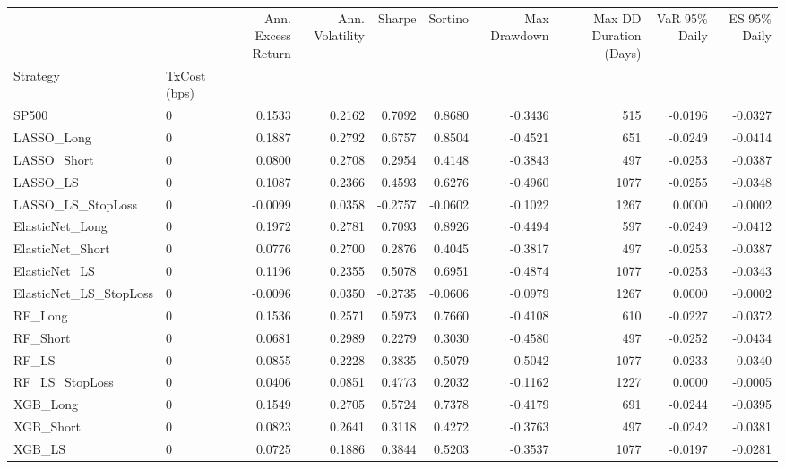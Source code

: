 \begin{tabular}{llrrrrrrrr}
\toprule
 &  & Ann. Excess Return & Ann. Volatility & Sharpe & Sortino & Max Drawdown & Max DD Duration (Days) & VaR 95\% Daily & ES 95\% Daily \\
Strategy & TxCost (bps) &  &  &  &  &  &  &  &  \\
\midrule
SP500 & 0 & 0.1533 & 0.2162 & 0.7092 & 0.8680 & -0.3436 & 515 & -0.0196 & -0.0327 \\
\cline{1-10}
LASSO\_Long & 0 & 0.1887 & 0.2792 & 0.6757 & 0.8504 & -0.4521 & 651 & -0.0249 & -0.0414 \\
\cline{1-10}
LASSO\_Short & 0 & 0.0800 & 0.2708 & 0.2954 & 0.4148 & -0.3843 & 497 & -0.0253 & -0.0387 \\
\cline{1-10}
LASSO\_LS & 0 & 0.1087 & 0.2366 & 0.4593 & 0.6276 & -0.4960 & 1077 & -0.0255 & -0.0348 \\
\cline{1-10}
LASSO\_LS\_StopLoss & 0 & -0.0099 & 0.0358 & -0.2757 & -0.0602 & -0.1022 & 1267 & 0.0000 & -0.0002 \\
\cline{1-10}
ElasticNet\_Long & 0 & 0.1972 & 0.2781 & 0.7093 & 0.8926 & -0.4494 & 597 & -0.0249 & -0.0412 \\
\cline{1-10}
ElasticNet\_Short & 0 & 0.0776 & 0.2700 & 0.2876 & 0.4045 & -0.3817 & 497 & -0.0253 & -0.0387 \\
\cline{1-10}
ElasticNet\_LS & 0 & 0.1196 & 0.2355 & 0.5078 & 0.6951 & -0.4874 & 1077 & -0.0253 & -0.0343 \\
\cline{1-10}
ElasticNet\_LS\_StopLoss & 0 & -0.0096 & 0.0350 & -0.2735 & -0.0606 & -0.0979 & 1267 & 0.0000 & -0.0002 \\
\cline{1-10}
RF\_Long & 0 & 0.1536 & 0.2571 & 0.5973 & 0.7660 & -0.4108 & 610 & -0.0227 & -0.0372 \\
\cline{1-10}
RF\_Short & 0 & 0.0681 & 0.2989 & 0.2279 & 0.3030 & -0.4580 & 497 & -0.0252 & -0.0434 \\
\cline{1-10}
RF\_LS & 0 & 0.0855 & 0.2228 & 0.3835 & 0.5079 & -0.5042 & 1077 & -0.0233 & -0.0340 \\
\cline{1-10}
RF\_LS\_StopLoss & 0 & 0.0406 & 0.0851 & 0.4773 & 0.2032 & -0.1162 & 1227 & 0.0000 & -0.0005 \\
\cline{1-10}
XGB\_Long & 0 & 0.1549 & 0.2705 & 0.5724 & 0.7378 & -0.4179 & 691 & -0.0244 & -0.0395 \\
\cline{1-10}
XGB\_Short & 0 & 0.0823 & 0.2641 & 0.3118 & 0.4272 & -0.3763 & 497 & -0.0242 & -0.0381 \\
\cline{1-10}
XGB\_LS & 0 & 0.0725 & 0.1886 & 0.3844 & 0.5203 & -0.3537 & 1077 & -0.0197 & -0.0281 \\

\end{tabular}
